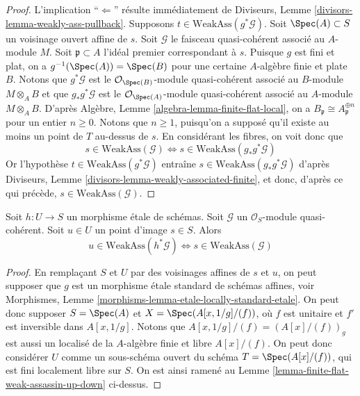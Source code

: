 \begin{proof}
L'implication ``$\Leftarrow$'' résulte immédiatement de
Diviseurs, Lemme \ref{divisors-lemma-weakly-ass-pullback}.
Supposons $t \in \text{WeakAss}(g^*\mathcal{G})$.
Soit $\Spec(A) \subset S$ un voisinage ouvert affine de $s$.
Soit $\mathcal{G}$ le faisceau quasi-cohérent associé au $A$-module $M$.
Soit $\mathfrak p \subset A$ l'idéal premier correspondant à $s$.
Puisque $g$ est fini et plat, on a $g^{-1}(\Spec(A)) = \Spec(B)$
pour une certaine $A$-algèbre finie et plate $B$. Notons que
$g^*\mathcal{G}$ est le $\mathcal{O}_{\Spec(B)}$-module quasi-cohérent
associé au $B$-module $M \otimes_A B$ et que $g_*g^*\mathcal{G}$ est le
$\mathcal{O}_{\Spec(A)}$-module quasi-cohérent associé au
$A$-module $M \otimes_A B$. D'après
Algèbre, Lemme \ref{algebra-lemma-finite-flat-local},
on a $B_{\mathfrak p} \cong A_{\mathfrak p}^{\oplus n}$
pour un entier $n \geq 0$. Notons que $n \geq 1$, puisqu'on a supposé qu'il
existe au moins un point de $T$ au-dessus de $s$. En considérant
les fibres, on voit donc que
$$
s \in \text{WeakAss}(\mathcal{G})
\Leftrightarrow
s \in \text{WeakAss}(g_*g^*\mathcal{G})
$$
Or l'hypothèse $t \in \text{WeakAss}(g^*\mathcal{G})$
entraîne $s \in \text{WeakAss}(g_*g^*\mathcal{G})$ d'après
Diviseurs, Lemme \ref{divisors-lemma-weakly-associated-finite},
et donc, d'après ce qui précède, $s \in  \text{WeakAss}(\mathcal{G})$.
\end{proof}

\begin{lemma}
\label{lemma-etale-weak-assassin-up-down}
Soit $h : U \to S$ un morphisme \'etale de schémas.
Soit $\mathcal{G}$ un $\mathcal{O}_S$-module quasi-cohérent.
Soit $u \in U$ un point d'image $s \in S$. Alors
$$
u \in \text{WeakAss}(h^*\mathcal{G})
\Leftrightarrow
s \in \text{WeakAss}(\mathcal{G})
$$
\end{lemma}

\begin{proof}
En remplaçant $S$ et $U$ par des voisinages affines de $s$ et $u$,
on peut supposer que $g$ est un morphisme \'etale standard de schémas affines, voir
Morphismes, Lemme \ref{morphisms-lemma-etale-locally-standard-etale}.
On peut donc supposer $S = \Spec(A)$ et
$X = \Spec(A[x, 1/g]/(f))$, où $f$ est unitaire et $f'$
est inversible dans $A[x, 1/g]$.
Notons que $A[x, 1/g]/(f) = (A[x]/(f))_g$ est aussi un localisé
de la $A$-algèbre finie et libre $A[x]/(f)$. On peut donc considérer
$U$ comme un sous-schéma ouvert du schéma $T = \Spec(A[x]/(f))$,
qui est fini localement libre sur $S$. On est ainsi ramené au
Lemme \ref{lemma-finite-flat-weak-assassin-up-down}
ci-dessus.
\end{proof}

